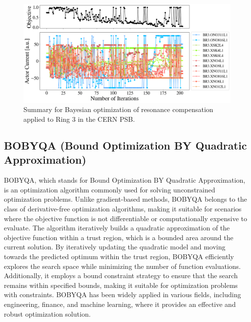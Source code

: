 \begin{figure}[H]
    \centering
    \includegraphics[width=\linewidth]{chapter5/2023_05_02_R3_LHCramp_BayesOpt.png}
    \caption{Summary for Bayesian optimization of resonance compensation applied to Ring 3 in the CERN PSB.}
    \label{fig:bo2}
\end{figure}

\subsection{BOBYQA (Bound Optimization BY Quadratic Approximation)}

BOBYQA, which stands for Bound Optimization BY Quadratic Approximation, is an optimization algorithm commonly used for solving unconstrained optimization problems. Unlike gradient-based methods, BOBYQA belongs to the class of derivative-free optimization algorithms, making it suitable for scenarios where the objective function is not differentiable or computationally expensive to evaluate. The algorithm iteratively builds a quadratic approximation of the objective function within a trust region, which is a bounded area around the current solution. By iteratively updating the quadratic model and moving towards the predicted optimum within the trust region, BOBYQA efficiently explores the search space while minimizing the number of function evaluations. Additionally, it employs a bound constraint strategy to ensure that the search remains within specified bounds, making it suitable for optimization problems with constraints. BOBYQA has been widely applied in various fields, including engineering, finance, and machine learning, where it provides an effective and robust optimization solution.

